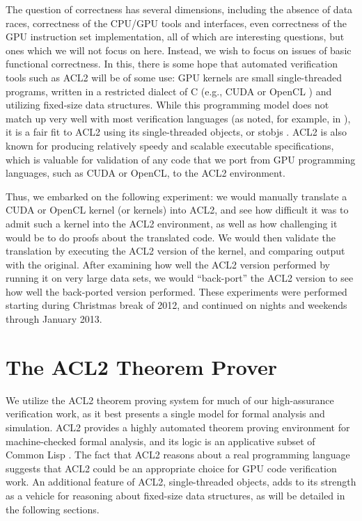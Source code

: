 \documentclass[copyright]{eptcs}
\begin{document}
The question of correctness has several dimensions, including the absence
of data races, correctness of the CPU/GPU tools and interfaces, even
correctness of the GPU instruction set implementation, all of which 
are interesting questions, but ones which we will not focus on 
here.  Instead, we wish to focus on issues of basic
functional correctness.  In this, there is some hope that automated
verification tools such as ACL2 will be of some use: GPU kernels are
small single-threaded programs, written in a restricted dialect of C
(e.g., CUDA \cite{CUDA} or OpenCL \cite{OpenCL}) and utilizing
fixed-size data structures.  While this programming model does not
match up very well with most verification languages (as noted, for example, in
\cite{Hardin2009a}), it is a fair fit to ACL2 using its
single-threaded objects, or stobjs \cite{STOBJ}.  ACL2 is also
known for producing relatively speedy and scalable executable specifications,
which is valuable for validation of any code that we port from GPU
programming languages, such as CUDA or OpenCL, to the ACL2 environment.

Thus, we embarked on the following experiment: we would manually translate a
CUDA or OpenCL kernel (or kernels) into ACL2, and see how difficult it was to admit
such a kernel into the ACL2 environment, as well as how challenging it would be
to do proofs about the translated code.  We would then validate the
translation by executing the ACL2 version of the kernel, and comparing
output with the original.  After examining how well the ACL2
version performed by running it on very large data sets, we would 
``back-port'' the ACL2 version to see how well the back-ported
version performed.  These experiments were performed starting during
Christmas break of 2012, and continued on nights and weekends through 
January 2013.

\section{The ACL2 Theorem Prover}

We utilize the ACL2 theorem proving system \cite{ACL2book} for much of our high-assurance verification work, as it best presents a single model for formal
analysis and simulation.   
ACL2 provides a highly automated theorem proving environment for machine-checked formal 
analysis, and its logic is an applicative subset of Common Lisp
\cite{CommonLispHyperSpec}.  The fact that ACL2 reasons about 
a real programming language suggests that ACL2 could be an appropriate choice for  
GPU code verification work.  An additional feature of ACL2, single-threaded objects, 
adds to its strength as a vehicle for reasoning about fixed-size data
structures, as will be detailed in the following sections.
\end{document}
